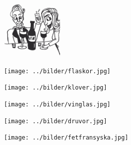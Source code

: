 $  $%
%

\begin{figure}[!b]
\begin{center}
\includegraphics[width=3cm]{../bilder/fardigabilder/BilderTillKapitel/vinvisor.png} 
\end{center}
\end{figure}
\clearpage

\clearpage

\clearpage

\begin{figure}[!b]
\begin{center}
\texttt{[image: ../bilder/flaskor.jpg]} 
\end{center}
\end{figure}
\clearpage

%
\begin{figure}[!b]
\begin{center}
\texttt{[image: ../bilder/klover.jpg]} 
\end{center}
\end{figure}
\clearpage

\begin{figure}[!b]
\begin{center}
\texttt{[image: ../bilder/vinglas.jpg]} 
\end{center}
\end{figure}
\clearpage

\clearpage

\clearpage

%
\clearpage

\begin{figure}[!b]
\begin{center}
\texttt{[image: ../bilder/druvor.jpg]} 
\end{center}
\end{figure}
\clearpage

\begin{figure}[!b]
\begin{center}
\texttt{[image: ../bilder/fetfransyska.jpg]} 
\end{center}
\end{figure}
\clearpage
%

